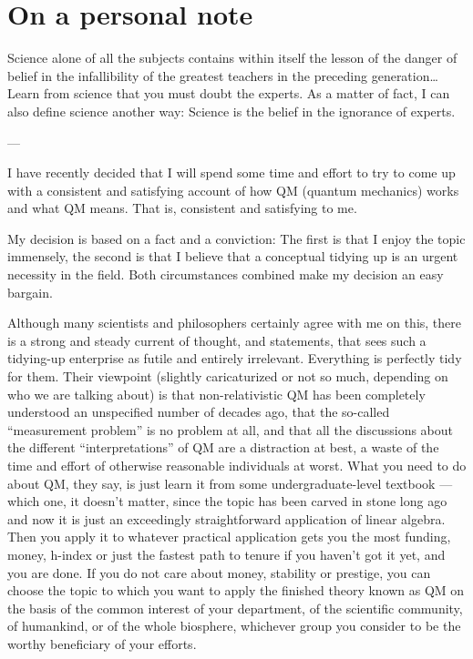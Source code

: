 \documentclass[12pt]{article}
\begin{document}
\section{On a personal note}
\label{sec:personal}

\begin{flushright}
\parbox[h]{5in}{{\small
Science alone of all the subjects contains within itself the lesson of 
the danger of belief in the infallibility of the greatest teachers in the 
preceding generation\ldots Learn from science that you must doubt the experts. 
As a matter of fact, I can also define science another way: Science is the 
belief in the ignorance of experts.
\begin{flushright}
\vspace{-23.5pt}
--- \cite{Feynman1968}
\end{flushright}
}}
\end{flushright}

I have recently decided that I will spend some time and effort to try to come
up with a consistent and satisfying account of how QM (quantum mechanics)
works and what QM means. That is, consistent and satisfying to me.

My decision is based on a fact and a conviction: The first is that I enjoy the
topic immensely, the second is that I believe that a conceptual tidying up is
an urgent necessity in the field. Both circumstances combined make my decision
an easy bargain.

Although many scientists and philosophers certainly agree with me on this,
there is a strong and steady current of thought, and statements, that sees
such a tidying-up enterprise as futile and entirely irrelevant. Everything is
perfectly tidy for them. Their viewpoint (slightly caricaturized or not so
much, depending on who we are talking about) is that non-relativistic QM has
been completely understood an unspecified number of decades ago, that the
so-called ``measurement problem'' is no problem at all, and that all the
discussions about the different ``interpretations'' of QM are a distraction at
best, a waste of the time and effort of otherwise reasonable individuals at
worst. What you need to do about QM, they say, is just learn it from some
undergraduate-level textbook ---which one, it doesn't matter, since the topic
has been carved in stone long ago and now it is just an exceedingly
straightforward application of linear algebra. Then you apply it to whatever
practical application gets you the most funding, money, h-index or just the
fastest path to tenure if you haven't got it yet, and you are done. If you do
not care about money, stability or prestige, you can choose the topic to which
you want to apply the finished theory known as QM on the basis of the common
interest of your department, of the scientific community, of humankind, or of
the whole biosphere, whichever group you consider to be the worthy beneficiary
of your efforts.
\end{document}
